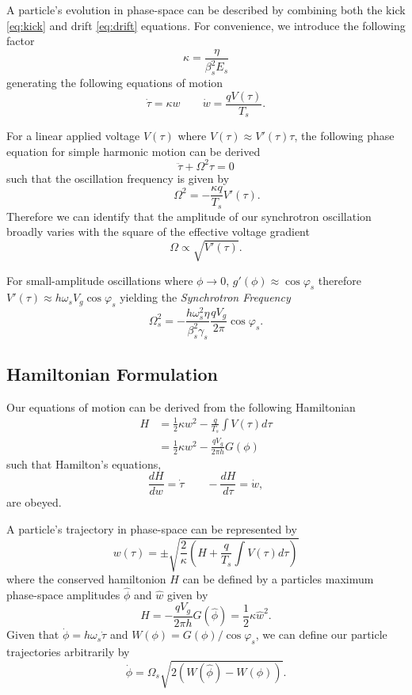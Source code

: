A particle's evolution in phase-space can be described by combining both the kick \eqref{eq:kick} and drift \eqref{eq:drift} equations. For convenience, we introduce the following factor $$\kappa = \frac{\eta}{\beta_s^2E_s}$$ generating the following equations of motion
\begin{equation}
    \dot{\tau} = \kappa w \qquad \dot{w} = \frac{qV(\tau)}{T_s}
    \label{eq:eom}.
\end{equation}

For a linear applied voltage $V(\tau)$ where $V(\tau) \approx V'(\tau)\tau$, the following phase equation for simple harmonic motion can be derived $$\ddot{\tau}+\Omega^2\tau = 0$$ such that the oscillation frequency is given by $$\qquad \Omega^2 = -\frac{\kappa q}{T_s}V'(\tau).$$ Therefore we can identify that the amplitude of our synchrotron oscillation broadly varies with the square of the effective voltage gradient $$\Omega \propto \sqrt{V'(\tau)}.$$

For small-amplitude oscillations where $\phi \to 0$, $g'(\phi) \approx \cos\varphi_s$ therefore $V'(\tau)\approx h\omega_s V_g \cos\varphi_s$ yielding the \textit{Synchrotron Frequency}
\begin{equation}
    \Omega_s^2 = -\frac{h\omega_s^2\eta}{\beta_s^2\gamma_s}\frac{qV_g}{2\pi}\cos\varphi_s
    \label{eq:synchrotron_frequency}.
\end{equation}

\subsection{Hamiltonian Formulation}

Our equations of motion can be derived from the following Hamiltonian
$$\begin{aligned}
        H & = \frac{1}{2}\kappa w^2 -\frac{q}{T_s}\int V(\tau)d\tau \\
          & = \frac{1}{2}\kappa w^2 -\frac{q V_g}{2\pi h}G(\phi)
    \end{aligned}$$ such that Hamilton's equations, $$\frac{dH}{dw} = \dot{\tau} \qquad -\frac{dH}{d\tau} = \dot{w},$$ are obeyed.

A particle's trajectory in phase-space can be represented by $$w(\tau) = \pm \sqrt{\frac{2}{\kappa}\left(H+\frac{q}{T_s}\int V(\tau) d\tau\right)}$$ where the conserved hamiltonion $H$ can be defined by a particles maximum phase-space amplitudes $\hat{\phi}$ and $\hat{w}$ given by
$$H = -\frac{qV_g}{2\pi h}G(\hat{\phi}) = \frac{1}{2}\kappa \hat{w}^2.$$ Given that $\dot{\phi} = h\omega_s\dot{\tau}$ and $W(\phi) = G(\phi)/\cos\varphi_s$, we can define our particle trajectories arbitrarily by $$\dot{\phi} = \Omega_s \sqrt{2(W(\hat{\phi})-W(\phi))}.$$

